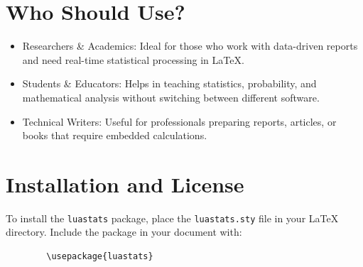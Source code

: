 \documentclass{article}
\begin{document}
	\section{Who Should Use?}
	\begin{itemize}
		\item Researchers \& Academics: Ideal for those who work with data-driven reports and need real-time statistical processing in LaTeX.
		\item Students \& Educators: Helps in teaching statistics, probability, and mathematical analysis without switching between different software.
		\item Technical Writers: Useful for professionals preparing reports, articles, or books that require embedded calculations.
	\end{itemize}
	
	\section{Installation and License}
	
	To install the \texttt{luastats} package, place the \texttt{luastats.sty} file in your LaTeX directory. Include the package in your document with:
	
	\begin{verbatim}
		\usepackage{luastats}
	\end{verbatim}

	
	
	
	
	
\end{document}
